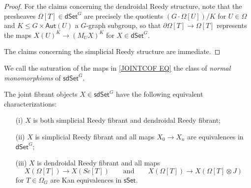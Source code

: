 \documentclass[a4paper,10pt
,draft
]{article}%
\begin{document}
\begin{proof}
	For the claims concerning the dendroidal Reedy structure, 
	note that the presheaves $\Omega[T] \in \mathsf{dSet}^G$
	are precisely the quotients $(G \cdot \Omega[U])/K$ for $U\in \Omega$ and $K \leq G \times \mathsf{Aut}(U)$ a $G$-graph subgroup,
	so that $\partial \Omega[T] \to \Omega[T]$
	represents the maps $X(U)^K \to (M_U X)^K$ for $X \in \mathsf{dSet}^G$.
	
	The claims concerning the simplicial Reedy structure are immediate.
\end{proof}


We call the saturation of the maps in \eqref{JOINTCOF EQ} the class of \textit{normal monomorphisms} of $\mathsf{sdSet}^G$.

\begin{corollary}\label{JOINTFIBCHAR COR}
The joint fibrant objects $X \in \mathsf{sdSet}^G$ have the following equivalent characterizations:
\begin{itemize}
	\item[(i)] $X$ is both simplicial Reedy fibrant and dendroidal Reedy fibrant;
	\item[(ii)] $X$ is simplicial Reedy fibrant and all maps 
	$X_0 \to X_n$ are equivalences in $\mathsf{dSet}^{G}$;
	\item[(iii)] $X$ is dendroidal Reedy fibrant and all maps
\[
	X\left(\Omega[T]\right) \to X\left(Sc[T]\right)
\qquad \text{and} \qquad
	X\left(\Omega[T]\right) \to X(\Omega[T]\otimes J)
\]
for $T \in \Omega_G$ are Kan equivalences in $\mathsf{sSet}$.
\end{itemize}
\end{corollary}
\end{document}
